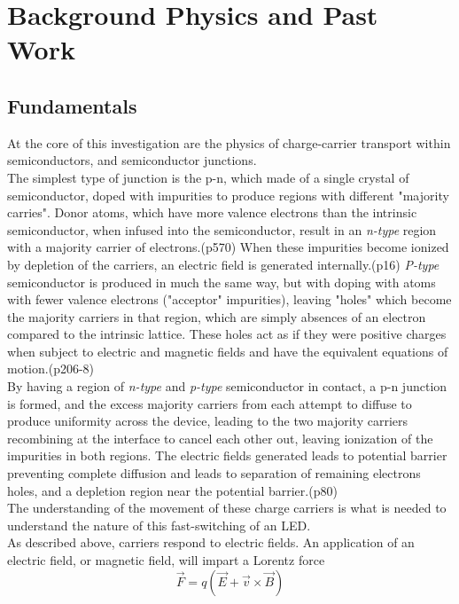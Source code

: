 \documentclass[titlepage]{article}
\begin{document}
\section{Background Physics and Past Work}
\subsection{Fundamentals}
At the core of this investigation are the physics of charge-carrier transport within semiconductors, and semiconductor junctions.\\
The simplest type of junction is the p-n, which made of a single crystal of semiconductor, doped with impurities to produce regions with different "majority carries". Donor atoms, which have more valence electrons than the intrinsic semiconductor, when infused into the semiconductor, result in an \textit{n-type} region with a majority carrier of electrons.\cite{Kittel}(p570) When these impurities become ionized by depletion of the carriers, an electric field is generated internally.\cite{Sze}(p16) \textit{P-type} semiconductor is produced in much the same way, but with doping with atoms with fewer valence electrons ("acceptor" impurities), leaving "holes" which become the majority carriers in that region, which are simply absences of an electron compared to the intrinsic lattice. These holes act as if they were  positive charges when subject to electric and magnetic fields and have the equivalent equations of motion.\cite{Kittel}(p206-8)\\
By having a region of \textit{n-type} and \textit{p-type} semiconductor in contact, a p-n junction is formed, and the excess majority carriers from each attempt to diffuse to produce uniformity across the device, leading to the two majority carriers recombining at the interface to cancel each other out, leaving ionization of the impurities in both regions. The electric fields generated leads to potential barrier preventing complete diffusion and leads to separation of remaining electrons holes, and a depletion region near the potential barrier.\cite{Sze}(p80)\\
The understanding of the movement of these charge carriers is what is needed to understand the nature of this fast-switching of an LED.\\
As described above, carriers respond to electric fields. An application of an electric field, or magnetic field, will impart a Lorentz force
\begin{equation}
\vec{F} = q(\vec{E}+\vec{v}\times\vec{B})
\end{equation}
\end{document}
